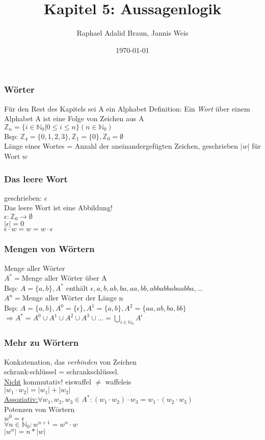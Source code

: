 \documentclass{beamer}
\title{Kapitel 5: Aussagenlogik}
\author{Raphael Adalid Braun, Jannis Weis}
\date{\today}
\institute{KIT - Karlruher Institut für Technologie}
\begin{document}
	\begin{frame}
		\frametitle{Wörter}
		Für den Rest des Kapitels sei A ein Alphabet
		Definition: Ein \emph{Wort} über einem Alphabet A ist eine Folge von Zeichen aus A\\
		$\mathbb{Z}_{n}=\{i\in\mathbb{N}_{0}\vert0\leq i\leq n\} (n\in\mathbb{N}_{0})$\\
		Bsp: $\mathbb{Z}_{4} =\{0,1,2,3\},\mathbb{Z}_{1}=\{0\},\mathbb{Z}_{0}=\emptyset$\\
		Länge eines Wortes = Anzahl der aneinandergefügten Zeichen, geschrieben $\lvert w\rvert$ für Wort $w$\\
	\end{frame}
	\begin{frame}
		\frametitle{Das leere Wort}
		geschrieben: $\epsilon$\\
		Das leere Wort ist eine Abbildung!\\
		$\epsilon :\mathbb{Z}_{0}\longrightarrow\emptyset$\\
		$\lvert\epsilon\rvert = 0$\\
		$\epsilon\cdot w = w = w\cdot\epsilon$\\
	\end{frame}
	\begin{frame}
		\frametitle{Mengen von Wörtern}
		Menge aller Wörter\\
		$A^{\ast}=$Menge aller Wörter über A\\
		Bsp: $A = \{a, b\}, A^{\ast}$ enthält $\epsilon, a, b, ab, ba, aa, bb, abbabbabaabba,\dots$\\
		$A^{n}=$Menge aller Wörter der Länge n\\
		Bsp: $A=\{a,b\}, A^{0}=\{\epsilon\},A^{1}=\{a,b\},A^{2}=\{aa,ab,ba,bb\}$\\
		$\Rightarrow A^{\ast}=A^{0}\cup A^{1}\cup A^{2}\cup A^{3}\cup\dots = \bigcup\limits_{i\in\mathbb{N}_0}A^{i}$\\%
	\end{frame}
	\begin{frame}
		\frametitle{Mehr zu Wörtern}
		Konkatenation, das \emph{verbinden} von Zeichen\\
		schrank$\cdot$schlüssel = schrankschlüssel.\\
		\underline{Nicht} kommutativ! eiswaffel $\neq$ waffeleis\\
		$\lvert w_{1}\cdot w_{2}\rvert =\lvert w_{1}\rvert + \lvert w_{2}\rvert$\\
		\underline{Assoziativ:}$\forall w_{1},w_{2},w_{3}\in A^{\ast}:(w_{1}\cdot w_{2})\cdot w_{3} = w_{1}\cdot (w_{2}\cdot w_{3})$\\
		Potenzen von Wörtern\\
		$w^{0}=\epsilon$\\
		$\forall n\in\mathbb{N}_{0}:w^{n+1}=w^{n}\cdot w$\\
		$\lvert w^{n}\rvert = n\ast \lvert w\rvert$\\
	\end{frame}
\end{document}
